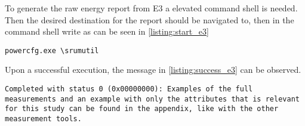 To generate the raw energy report from E3 a elevated command shell is needed. Then the desired destination for the report should be navigated to, then in the command shell write as can be seen in \cref{listing:start_e3}

\begin{lstlisting}[caption=How to start E3, label=listing:start_e3]
    powercfg.exe \srumutil
\end{lstlisting}

Upon a successful execution, the message in \cref{listing:success_e3} can be observed.

\begin{lstlisting}[caption=If the report is created successfully
    , label=listing:success_e3]
    Completed with status 0 (0x00000000): Examples of the full measurements and an example with only the attributes that is relevant for this study can be found in the appendix, like with the other measurement tools.
\end{lstlisting}



% 